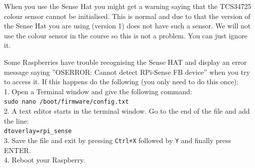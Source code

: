 \documentclass{article}
\begin{document}
\parbox[t]{14cm}{When you use the Sense Hat you might get a warning saying that the TCS34725 colour sensor cannot be initialised. This is normal and due to that the version of the Sense Hat you are using (version 1) does not have such a sensor. We will not use the colour sensor in the course so this is not a problem. You can just ignore it.}

\parbox[t]{14cm}{Some Raspberries have trouble recognising the Sense HAT and display an error message saying ''OSERROR: Cannot detect RPi-Sense FB device'' when you try to access it. If this happens do the following (you only need to do this once):\\1. Open a Terminal window and give the following command:\\\texttt{sudo nano /boot/firmware/config.txt}\\2. A text editor starts in the terminal window. Go to the end of the file and add the line:\\\texttt{dtoverlay=rpi\_sense}\\3. Save the file and exit by pressing \texttt{Ctrl+X} followed by \texttt{Y} and finally press ENTER.\\4. Reboot your Raspberry.}
\end{document}
